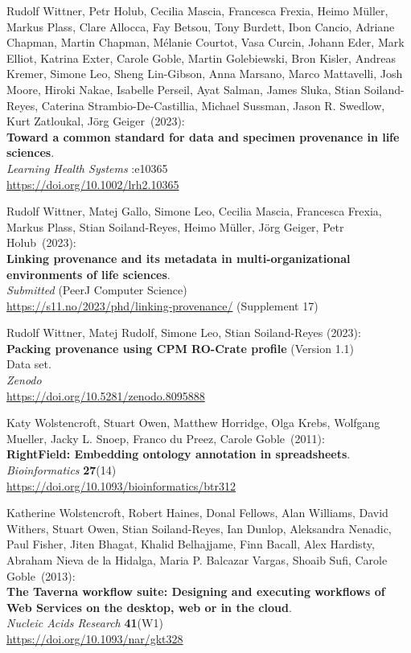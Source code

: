 \begin{thebibliography}{9}
Rudolf Wittner, Petr Holub, Cecilia Mascia, Francesca Frexia, Heimo Müller, Markus Plass, Clare Allocca, Fay Betsou, Tony Burdett, Ibon Cancio, Adriane Chapman, Martin Chapman, Mélanie Courtot, Vasa Curcin, Johann Eder, Mark Elliot, Katrina Exter, Carole Goble, Martin Golebiewski, Bron Kisler, Andreas Kremer, Simone Leo, Sheng Lin-Gibson, Anna Marsano, Marco Mattavelli, Josh Moore, Hiroki Nakae, Isabelle Perseil, Ayat Salman, James Sluka, Stian Soiland-Reyes, Caterina Strambio-De-Castillia, Michael Sussman, Jason R. Swedlow, Kurt Zatloukal, Jörg Geiger~(2023): \\
\textbf{Toward a common standard for data and specimen provenance in life sciences}.\\
\emph{Learning Health Systems} :e10365 \\
\url{https://doi.org/10.1002/lrh2.10365}

Rudolf Wittner, Matej Gallo, Simone Leo, Cecilia Mascia, Francesca Frexia, Markus Plass, Stian Soiland-Reyes, Heimo Müller, Jörg Geiger, Petr Holub~(2023): \\
\textbf{Linking provenance and its metadata in multi-organizational environments of life sciences}.\\
\emph{Submitted} (PeerJ Computer Science)\\
\url{https://s11.no/2023/phd/linking-provenance/}
(Supplement 17)

Rudolf Wittner, Matej Rudolf, Simone Leo, Stian Soiland-Reyes (2023): \\
\textbf{Packing provenance using CPM RO-Crate profile} (Version 1.1)\\
Data set.\\
\emph{Zenodo}\\
\url{https://doi.org/10.5281/zenodo.8095888}

Katy Wolstencroft, Stuart Owen, Matthew Horridge, Olga Krebs, Wolfgang Mueller, Jacky L. Snoep, Franco du Preez, Carole Goble~(2011): \\
\textbf{RightField: Embedding ontology annotation in spreadsheets}. \\
\emph{Bioinformatics} \textbf{27}(14) \\
\url{https://doi.org/10.1093/bioinformatics/btr312}

Katherine Wolstencroft, Robert Haines, Donal Fellows, Alan Williams,
David Withers, Stuart Owen, Stian Soiland-Reyes, Ian Dunlop, Aleksandra
Nenadic, Paul Fisher, Jiten Bhagat, Khalid Belhajjame, Finn Bacall, Alex
Hardisty, Abraham Nieva de la Hidalga, Maria P. Balcazar Vargas, Shoaib
Sufi, Carole Goble~(2013): \\
\textbf{The {Taverna} workflow suite: Designing
and executing workflows of {Web Services} on the desktop, web or in the
cloud}. \\
\emph{Nucleic Acids Research} \textbf{41}(W1) \\
\url{https://doi.org/10.1093/nar/gkt328}


\end{thebibliography}

